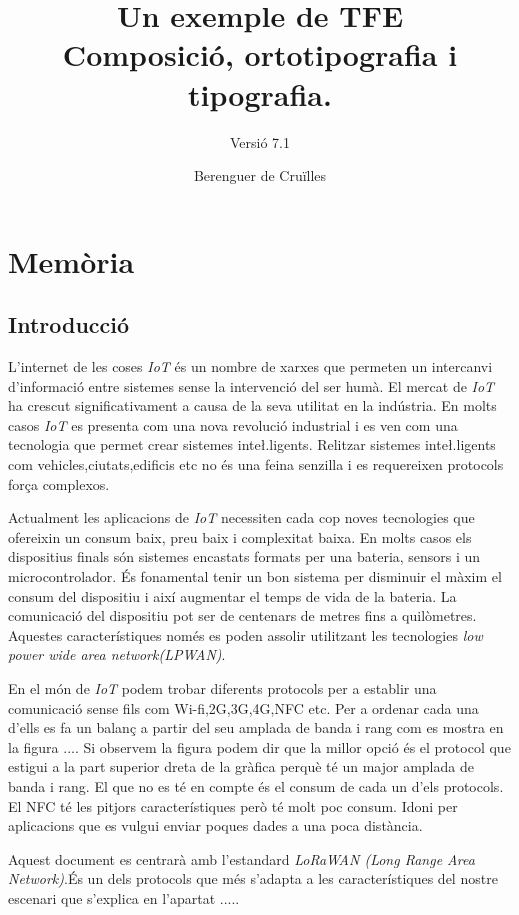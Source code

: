\documentclass{tfgitic}[2024/07/01]
\title{
  Un exemple de TFE\\
  Composició, ortotipografia i tipografia.
}
\subtitle{Versió 7.1}
\author{Berenguer de Cruïlles}
\begin{document}
\part{Memòria}

\chapter{Introducció}
\label{cap:intro}

L'internet de les coses \emph{IoT} és un nombre de xarxes que permeten un intercanvi d'informació entre sistemes 
sense la intervenció del ser humà. El mercat de \emph{IoT} ha crescut significativament a causa de la seva utilitat en la indústria. 
En molts casos \emph{IoT} es presenta com una nova revolució industrial i es ven com una tecnologia
que permet crear sistemes inte\l.ligents. Relitzar sistemes inte\l.ligents com 
vehicles,ciutats,edificis etc no és una feina senzilla i es requereixen protocols força complexos.

Actualment les aplicacions de \emph{IoT} necessiten cada cop  noves tecnologies que ofereixin un consum baix, preu baix   
i complexitat baixa. En molts casos els dispositius finals són sistemes encastats formats per una bateria, sensors i 
un microcontrolador. És fonamental tenir un bon sistema per disminuir el màxim el consum del dispositiu i així augmentar
el temps de vida de la bateria. La comunicació del dispositiu pot ser de centenars de metres fins a quilòmetres.
Aquestes característiques només es poden assolir utilitzant les tecnologies \emph{low power wide area network(LPWAN)}.

En el món de \emph{IoT} podem trobar diferents protocols per a establir una comunicació sense fils com 
Wi-fi,2G,3G,4G,NFC etc. Per a ordenar cada una d'ells es fa un balanç a partir del seu amplada de banda
i rang com es mostra en la figura .... Si observem la figura podem dir que la millor opció
és el protocol que estigui a la part superior dreta de la gràfica perquè té un major
amplada de banda i rang. El que no es té en compte és el consum de cada un d'els protocols.
El NFC té les pitjors característiques però té molt poc consum. Idoni per aplicacions que 
es vulgui enviar poques dades a una poca distància.

Aquest document es centrarà amb l'estandard \emph{LoRaWAN (Long Range Area Network)}.És
un dels protocols que més s'adapta a les característiques del nostre escenari que s'explica
en l'apartat .....
\end{document}
